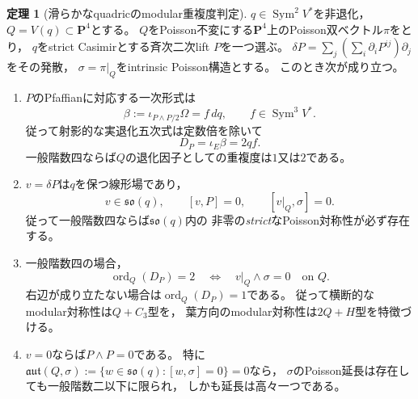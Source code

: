 \documentclass[a4paper,11pt]{ltjsarticle}
\theoremstyle{definition}
\newtheorem{theorem}{定理}[section]
\theoremstyle{definition}\newtheorem{definition}[theorem]{定義}
\theoremstyle{remark}\newtheorem{remark}[theorem]{注意}
\newcommand{\PP}{\mathbf P}\renewcommand{\AA}{\mathbf A}\newcommand{\CC}{\mathbf C}
\begin{document}
\begin{theorem}[滑らかなquadricのmodular重複度判定]
\label{thm:quadric-modular-multiplicity}
$q\in\operatorname{Sym}^2V^*$を非退化，$Q=V(q)\subset\PP^4$とする。
$Q$をPoisson不変にする$\PP^4$上のPoisson双ベクトル$\pi$をとり，
$q$をstrict Casimirとする斉次二次lift $P$を一つ選ぶ。
$\delta P=\sum_j(\sum_i\partial_iP^{ij})\partial_j$をその発散，
$\sigma=\pi|_Q$をintrinsic Poisson構造とする。
このとき次が成り立つ。
\begin{enumerate}
\item $P$のPfaffianに対応する一次形式は
\[
 \beta:=\iota_{P\wedge P/2}\Omega=f\,dq,\qquad
 f\in\operatorname{Sym}^3V^*.
 \tag{\(\star\)}\label{eq:quadric-beta-factor}
\]
従って射影的な実退化五次式は定数倍を除いて
\[
 D_P=\iota_E\beta=2qf.
\]
一般階数四ならば$Q$の退化因子としての重複度は$1$又は$2$である。
\item $v=\delta P$は$q$を保つ線形場であり，
\[
 v\in\mathfrak{so}(q),\qquad [v,P]=0,\qquad[v|_Q,\sigma]=0.
\]
従って一般階数四ならば$\mathfrak{so}(q)$内の
非零の\emph{strict}なPoisson対称性が必ず存在する。
\item 一般階数四の場合，
\[
 \operatorname{ord}_Q(D_P)=2
 \quad\Longleftrightarrow\quad
 v|_Q\wedge\sigma=0\quad\text{on }Q.
 \tag{\(\dagger\)}\label{eq:quadric-transverse-test}
\]
右辺が成り立たない場合は$\operatorname{ord}_Q(D_P)=1$である。
従って横断的なmodular対称性は$Q+C_3$型を，
葉方向のmodular対称性は$2Q+H$型を特徴づける。
\item $v=0$ならば$P\wedge P=0$である。
特に$\mathfrak{aut}(Q,\sigma)
:=\{w\in\mathfrak{so}(q):[w,\sigma]=0\}=0$なら，
$\sigma$のPoisson延長は存在しても一般階数二以下に限られ，
しかも延長は高々一つである。
\end{enumerate}
\end{theorem}
\end{document}
